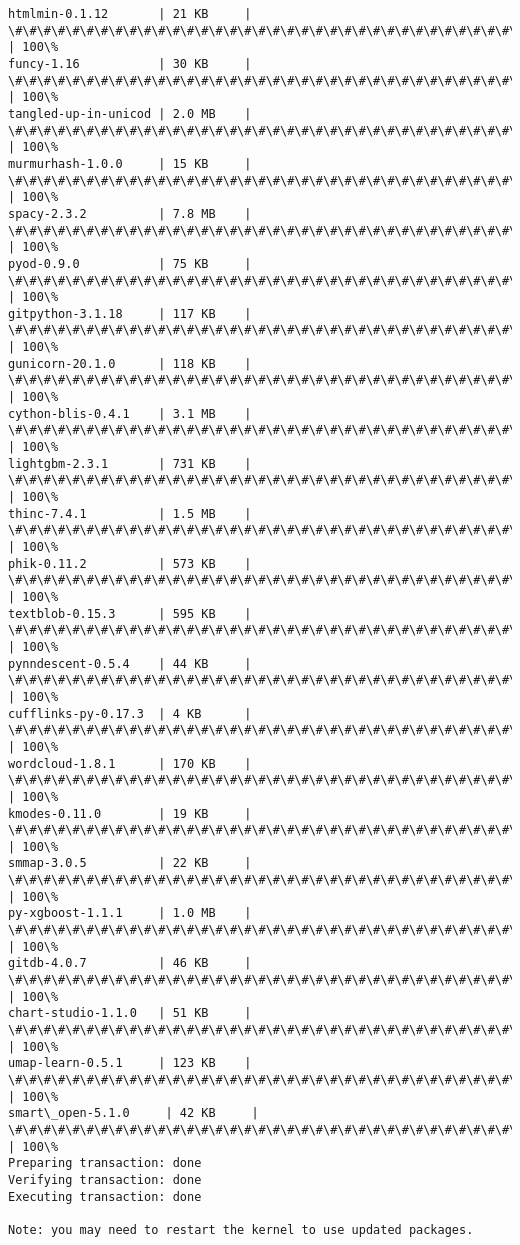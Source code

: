\documentclass[11pt]{article}
\begin{document}
\begin{Verbatim}[commandchars=\\\{\}]
htmlmin-0.1.12       | 21 KB     | \#\#\#\#\#\#\#\#\#\#\#\#\#\#\#\#\#\#\#\#\#\#\#\#\#\#\#\#\#\#\#\#\#\#\#\#\# | 100\%
funcy-1.16           | 30 KB     | \#\#\#\#\#\#\#\#\#\#\#\#\#\#\#\#\#\#\#\#\#\#\#\#\#\#\#\#\#\#\#\#\#\#\#\#\# | 100\%
tangled-up-in-unicod | 2.0 MB    | \#\#\#\#\#\#\#\#\#\#\#\#\#\#\#\#\#\#\#\#\#\#\#\#\#\#\#\#\#\#\#\#\#\#\#\#\# | 100\%
murmurhash-1.0.0     | 15 KB     | \#\#\#\#\#\#\#\#\#\#\#\#\#\#\#\#\#\#\#\#\#\#\#\#\#\#\#\#\#\#\#\#\#\#\#\#\# | 100\%
spacy-2.3.2          | 7.8 MB    | \#\#\#\#\#\#\#\#\#\#\#\#\#\#\#\#\#\#\#\#\#\#\#\#\#\#\#\#\#\#\#\#\#\#\#\#\# | 100\%
pyod-0.9.0           | 75 KB     | \#\#\#\#\#\#\#\#\#\#\#\#\#\#\#\#\#\#\#\#\#\#\#\#\#\#\#\#\#\#\#\#\#\#\#\#\# | 100\%
gitpython-3.1.18     | 117 KB    | \#\#\#\#\#\#\#\#\#\#\#\#\#\#\#\#\#\#\#\#\#\#\#\#\#\#\#\#\#\#\#\#\#\#\#\#\# | 100\%
gunicorn-20.1.0      | 118 KB    | \#\#\#\#\#\#\#\#\#\#\#\#\#\#\#\#\#\#\#\#\#\#\#\#\#\#\#\#\#\#\#\#\#\#\#\#\# | 100\%
cython-blis-0.4.1    | 3.1 MB    | \#\#\#\#\#\#\#\#\#\#\#\#\#\#\#\#\#\#\#\#\#\#\#\#\#\#\#\#\#\#\#\#\#\#\#\#\# | 100\%
lightgbm-2.3.1       | 731 KB    | \#\#\#\#\#\#\#\#\#\#\#\#\#\#\#\#\#\#\#\#\#\#\#\#\#\#\#\#\#\#\#\#\#\#\#\#\# | 100\%
thinc-7.4.1          | 1.5 MB    | \#\#\#\#\#\#\#\#\#\#\#\#\#\#\#\#\#\#\#\#\#\#\#\#\#\#\#\#\#\#\#\#\#\#\#\#\# | 100\%
phik-0.11.2          | 573 KB    | \#\#\#\#\#\#\#\#\#\#\#\#\#\#\#\#\#\#\#\#\#\#\#\#\#\#\#\#\#\#\#\#\#\#\#\#\# | 100\%
textblob-0.15.3      | 595 KB    | \#\#\#\#\#\#\#\#\#\#\#\#\#\#\#\#\#\#\#\#\#\#\#\#\#\#\#\#\#\#\#\#\#\#\#\#\# | 100\%
pynndescent-0.5.4    | 44 KB     | \#\#\#\#\#\#\#\#\#\#\#\#\#\#\#\#\#\#\#\#\#\#\#\#\#\#\#\#\#\#\#\#\#\#\#\#\# | 100\%
cufflinks-py-0.17.3  | 4 KB      | \#\#\#\#\#\#\#\#\#\#\#\#\#\#\#\#\#\#\#\#\#\#\#\#\#\#\#\#\#\#\#\#\#\#\#\#\# | 100\%
wordcloud-1.8.1      | 170 KB    | \#\#\#\#\#\#\#\#\#\#\#\#\#\#\#\#\#\#\#\#\#\#\#\#\#\#\#\#\#\#\#\#\#\#\#\#\# | 100\%
kmodes-0.11.0        | 19 KB     | \#\#\#\#\#\#\#\#\#\#\#\#\#\#\#\#\#\#\#\#\#\#\#\#\#\#\#\#\#\#\#\#\#\#\#\#\# | 100\%
smmap-3.0.5          | 22 KB     | \#\#\#\#\#\#\#\#\#\#\#\#\#\#\#\#\#\#\#\#\#\#\#\#\#\#\#\#\#\#\#\#\#\#\#\#\# | 100\%
py-xgboost-1.1.1     | 1.0 MB    | \#\#\#\#\#\#\#\#\#\#\#\#\#\#\#\#\#\#\#\#\#\#\#\#\#\#\#\#\#\#\#\#\#\#\#\#\# | 100\%
gitdb-4.0.7          | 46 KB     | \#\#\#\#\#\#\#\#\#\#\#\#\#\#\#\#\#\#\#\#\#\#\#\#\#\#\#\#\#\#\#\#\#\#\#\#\# | 100\%
chart-studio-1.1.0   | 51 KB     | \#\#\#\#\#\#\#\#\#\#\#\#\#\#\#\#\#\#\#\#\#\#\#\#\#\#\#\#\#\#\#\#\#\#\#\#\# | 100\%
umap-learn-0.5.1     | 123 KB    | \#\#\#\#\#\#\#\#\#\#\#\#\#\#\#\#\#\#\#\#\#\#\#\#\#\#\#\#\#\#\#\#\#\#\#\#\# | 100\%
smart\_open-5.1.0     | 42 KB     | \#\#\#\#\#\#\#\#\#\#\#\#\#\#\#\#\#\#\#\#\#\#\#\#\#\#\#\#\#\#\#\#\#\#\#\#\# | 100\%
Preparing transaction: done
Verifying transaction: done
Executing transaction: done

Note: you may need to restart the kernel to use updated packages.
    \end{Verbatim}
\end{document}
